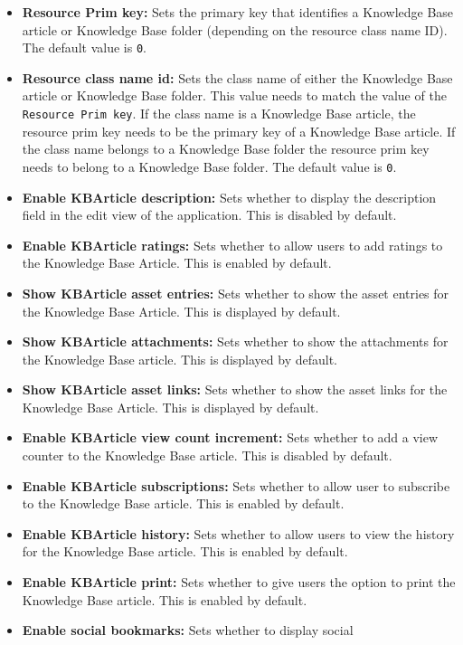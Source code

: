\begin{itemize}
\item
  \textbf{Resource Prim key:} Sets the primary key that identifies a
  Knowledge Base article or Knowledge Base folder (depending on the
  resource class name ID). The default value is \texttt{0}.
\item
  \textbf{Resource class name id:} Sets the class name of either the
  Knowledge Base article or Knowledge Base folder. This value needs to
  match the value of the \texttt{Resource\ Prim\ key}. If the class name
  is a Knowledge Base article, the resource prim key needs to be the
  primary key of a Knowledge Base article. If the class name belongs to
  a Knowledge Base folder the resource prim key needs to belong to a
  Knowledge Base folder. The default value is \texttt{0}.
\item
  \textbf{Enable KBArticle description:} Sets whether to display the
  description field in the edit view of the application. This is
  disabled by default.
\item
  \textbf{Enable KBArticle ratings:} Sets whether to allow users to add
  ratings to the Knowledge Base Article. This is enabled by default.
\item
  \textbf{Show KBArticle asset entries:} Sets whether to show the asset
  entries for the Knowledge Base Article. This is displayed by default.
\item
  \textbf{Show KBArticle attachments:} Sets whether to show the
  attachments for the Knowledge Base article. This is displayed by
  default.
\item
  \textbf{Show KBArticle asset links:} Sets whether to show the asset
  links for the Knowledge Base Article. This is displayed by default.
\item
  \textbf{Enable KBArticle view count increment:} Sets whether to add a
  view counter to the Knowledge Base article. This is disabled by
  default.
\item
  \textbf{Enable KBArticle subscriptions:} Sets whether to allow user to
  subscribe to the Knowledge Base article. This is enabled by default.
\item
  \textbf{Enable KBArticle history:} Sets whether to allow users to view
  the history for the Knowledge Base article. This is enabled by
  default.
\item
  \textbf{Enable KBArticle print:} Sets whether to give users the option
  to print the Knowledge Base article. This is enabled by default.
\item
  \textbf{Enable social bookmarks:} Sets whether to display social

\end{itemize}
